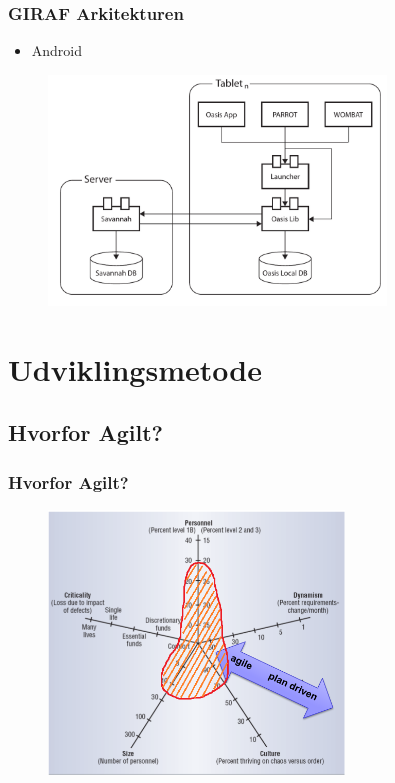 \documentclass{beamer}
\begin{document}
\begin{frame}
	\frametitle{GIRAF Arkitekturen}
	\begin{itemize}
		\item Android
	\end{itemize}
	\begin{figure}[!h]
		\centering
			\includegraphics[width=0.8\textwidth]{../../../Reports/Group_4/Tex/Images/Giraf_comp.pdf}
		\label{fig:Giraf_comp}
	\end{figure}
\end{frame}

\section{Udviklingsmetode}

\subsection{Hvorfor Agilt?}

\begin{frame}
	\frametitle{Hvorfor Agilt?}
	
	\begin{figure}[!h]
		\centering
			\includegraphics[width=0.7\textwidth]{PolarChart.PNG}
		\label{fig:Polar Chart}
	\end{figure}
\end{frame}
\end{document}
